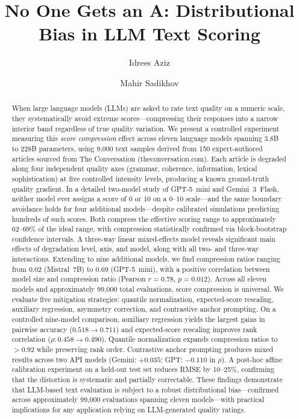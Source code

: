 \documentclass[11pt]{article}
\title{\textbf{No One Gets an A: Distributional Bias in LLM Text Scoring}}
\author{Idrees Aziz}
\author{Mahir Sadikhov}
\affil{Independent Researchers}
\date{}
\begin{document}
\maketitle

\begin{abstract}
When large language models (LLMs) are asked to rate text quality on a numeric scale, they systematically avoid extreme scores---compressing their responses into a narrow interior band regardless of true quality variation. We present a controlled experiment measuring this \emph{score compression} effect across eleven language models spanning 3.8B to 228B parameters, using 9{,}000 text samples derived from 150 expert-authored articles sourced from The Conversation (theconversation.com). Each article is degraded along four independent quality axes (grammar, coherence, information, lexical sophistication) at five controlled intensity levels, producing a known ground-truth quality gradient. In a detailed two-model study of GPT-5~mini and Gemini~3~Flash, neither model ever assigns a score of 0 or 10 on a 0--10 scale---and the same boundary avoidance holds for four additional models---despite calibrated simulations predicting hundreds of such scores. Both compress the effective scoring range to approximately 62--69\% of the ideal range, with compression statistically confirmed via block-bootstrap confidence intervals. A three-way linear mixed-effects model reveals significant main effects of degradation level, axis, and model, along with all two- and three-way interactions. Extending to nine additional models, we find compression ratios ranging from 0.02 (Mistral~7B) to 0.69 (GPT-5~mini), with a positive correlation between model size and compression ratio (Pearson $r = 0.78$, $p = 0.012$). Across all eleven models and approximately 99{,}000 total evaluations, score compression is universal. We evaluate five mitigation strategies: quantile normalization, expected-score rescaling, auxiliary regression, asymmetry correction, and contrastive anchor prompting. On a controlled nine-model comparison, auxiliary regression yields the largest gains in pairwise accuracy ($0.518 \to 0.711$) and expected-score rescaling improves rank correlation ($\rho: 0.458 \to 0.490$). Quantile normalization expands compression ratios to $>$0.92 while preserving rank order. Contrastive anchor prompting produces mixed results across two API models (Gemini: $+0.035$; GPT: $-0.110$ in $\rho$). A post-hoc affine calibration experiment on a held-out test set reduces RMSE by 10--25\%, confirming that the distortion is systematic and partially correctable. These findings demonstrate that LLM-based text evaluation is subject to a robust distributional bias---confirmed across approximately 99{,}000 evaluations spanning eleven models---with practical implications for any application relying on LLM-generated quality ratings.
\end{abstract}
\end{document}
